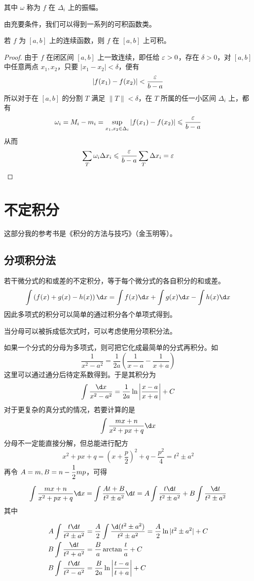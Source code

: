 其中 $\omega$ 称为 $f$ 在 $\Delta_i$ 上的振幅。

由充要条件，我们可以得到一系列的可积函数类。

\begin{theorem}
    若 $f$ 为 $[a,b]$ 上的连续函数，则 $f$ 在 $[a,b]$ 上可积。
\end{theorem}
\begin{proof}
    由于 $f$ 在闭区间 $[a,b]$ 上一致连续，即任给 $\varepsilon > 0$，存在 $\delta>0$，对 $[a,b]$ 中任意两点 $x_1,x_2$，只要 $|x_1-x_2|<\delta$，便有
    $$|f(x_1)-f(x_2)| < \frac{\varepsilon}{b-a}$$
    所以对于在 $[a,b]$ 的分割 $T$ 满足 $\|T\| < \delta$，在 $T$ 所属的任一小区间 $\Delta_i$ 上，都有
    $$\omega_i = M_i-m_i = \sup_{x_1,x_2\in\Delta_i}|f(x_1)-f(x_2)| \leqslant \frac{\varepsilon}{b-a}$$
    从而
    $$\sum_{T}\omega_i\Delta x_i \leqslant \frac{\varepsilon}{b-a}\sum_T\Delta x_i = \varepsilon$$
\end{proof}



\section{不定积分}

这部分我的参考书是《积分的方法与技巧》（金玉明等）。

\subsection{分项积分法}

若干微分式的和或差的不定积分，等于每个微分式的各自积分的和或差。
$$\int\left( f(x)+g(x)-h(x) \right)\d x = \int f(x)\d x + \int g(x)\d x - \int h(x)\d x$$
因此多项式的积分可以简单的通过积分各个单项式得到。

当分母可以被拆成低次式时，可以考虑使用分项积分法。

如果一个分式的分母为多项式，则可把它化成最简单的分式再积分。如
$$\frac{1}{x^2-a^2} = \frac{1}{2a}\left( \frac{1}{x-a}-\frac{1}{x+a} \right)$$
这里可以通过通分后待定系数得到。于是其积分为
$$\int \frac{\d x}{x^2-a^2} = \frac{1}{2a}\ln\left|\frac{x-a}{x+a}\right|+C$$
对于更复杂的真分式的情况，若要计算的是
$$\int \frac{mx+n}{x^2+px+q} \d x$$
分母不一定能直接分解，但总能进行配方
$$x^2+px+q = \left(x+\frac{p}{2}\right)^2+q-\frac{p^2}{4} = t^2 \pm a^2$$
再令 $A=m,B=n-\mfrac12mp$，可得
$$\int \frac{mx+n}{x^2+px+q} \d x = \int \frac{At+B}{t^2 \pm a^2} \d t
    = A\int \frac{t\d t}{t^2 \pm a^2} + B\int \frac{\d t}{t^2 \pm a^2}$$
其中

\begin{equation*}
    \begin{aligned}
        A\int \frac{t \d t}{t^2 \pm a^2} & = \frac{A}{2}\int \frac{\d(t^2 \pm a^2)}{t^2 \pm a^2} = \frac{A}{2} \ln|t^2 \pm a^2| +C \\
        B\int \frac{\d t}{t^2 + a^2}     & = \frac{B}{a}\arctan\frac{t}{a}+C                                                       \\
        B\int \frac{t \d t}{t^2 - a^2}   & = \frac{B}{2a}\ln\left|\frac{t-a}{t+a}\right|+C
    \end{aligned}
\end{equation*}

